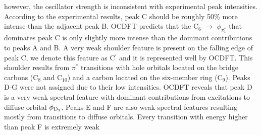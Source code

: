 \documentclass[8.5pt,twoside,twocolumn]{article}
\begin{document}
however, the oscillator strength is inconsistent with experimental peak intensities. According to the experimental results, peak C should be roughly 50\% more intense than the adjacent peak B. OCDFT predicts that the C$_6$ $\rightarrow$ $\phi_{\pi^*_1}$ that dominates peak C is only slightly more intense than the dominant contributions to peaks A and B. A very weak shoulder feature is present on the falling edge of peak C, we denote this feature as C$^{\prime}$ and it is represented well by OCDFT. This shoulder results from $\pi^*$ transitions with hole orbitals located on the bridge carbons (C$_8$ and C$_{10}$) and a carbon located on the six-member ring (C$_9$). Peaks D-G were not assigned due to their low intensities. OCDFT reveals that peak D is a very weak spectral feature with dominant contributions from excitations to diffuse orbital $\phi_{\rm D_3}$. Peaks E and F are also weak spectral features resulting mostly from transitions to diffuse orbitals. Every transition with energy higher than peak F is extremely weak 
\end{document}
